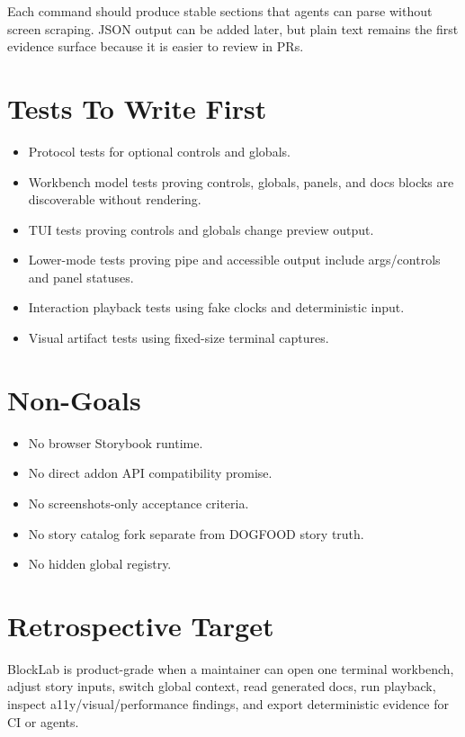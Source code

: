 Each command should produce stable sections that agents can parse without screen scraping. JSON output can be added later, but plain text remains the first evidence surface because it is easier to review in PRs.

\section{Tests To Write First}\label{record-135-tests-to-write-first}

\begin{itemize}
\tightlist
\item
  Protocol tests for optional controls and globals.
\item
  Workbench model tests proving controls, globals, panels, and docs blocks are discoverable without rendering.
\item
  TUI tests proving controls and globals change preview output.
\item
  Lower-mode tests proving pipe and accessible output include args/controls and panel statuses.
\item
  Interaction playback tests using fake clocks and deterministic input.
\item
  Visual artifact tests using fixed-size terminal captures.
\end{itemize}

\section{Non-Goals}\label{record-135-non-goals}

\begin{itemize}
\tightlist
\item
  No browser Storybook runtime.
\item
  No direct addon API compatibility promise.
\item
  No screenshots-only acceptance criteria.
\item
  No story catalog fork separate from DOGFOOD story truth.
\item
  No hidden global registry.
\end{itemize}

\section{Retrospective Target}\label{record-135-retrospective-target}

BlockLab is product-grade when a maintainer can open one terminal workbench, adjust story inputs, switch global context, read generated docs, run playback, inspect a11y/visual/performance findings, and export deterministic evidence for CI or agents.

